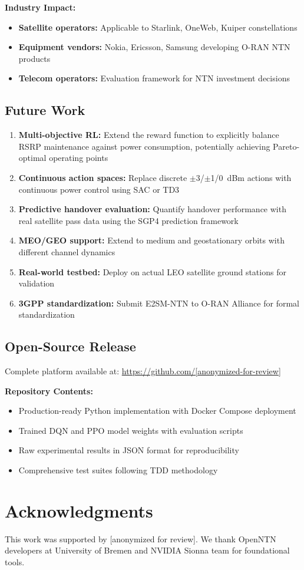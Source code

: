 \documentclass[conference]{IEEEtran}
\begin{document}
\textbf{Industry Impact:}
\begin{itemize}
    \item \textbf{Satellite operators:} Applicable to Starlink, OneWeb, Kuiper constellations
    \item \textbf{Equipment vendors:} Nokia, Ericsson, Samsung developing O-RAN NTN products
    \item \textbf{Telecom operators:} Evaluation framework for NTN investment decisions
\end{itemize}

\subsection{Future Work}

\begin{enumerate}
    \item \textbf{Multi-objective RL:} Extend the reward function to explicitly balance RSRP maintenance against power consumption, potentially achieving Pareto-optimal operating points
    \item \textbf{Continuous action spaces:} Replace discrete $\pm$3/$\pm$1/0~dBm actions with continuous power control using SAC or TD3
    \item \textbf{Predictive handover evaluation:} Quantify handover performance with real satellite pass data using the SGP4 prediction framework
    \item \textbf{MEO/GEO support:} Extend to medium and geostationary orbits with different channel dynamics
    \item \textbf{Real-world testbed:} Deploy on actual LEO satellite ground stations for validation
    \item \textbf{3GPP standardization:} Submit E2SM-NTN to O-RAN Alliance for formal standardization
\end{enumerate}

\subsection{Open-Source Release}

Complete platform available at: \url{https://github.com/[anonymized-for-review]}

\textbf{Repository Contents:}
\begin{itemize}
    \item Production-ready Python implementation with Docker Compose deployment
    \item Trained DQN and PPO model weights with evaluation scripts
    \item Raw experimental results in JSON format for reproducibility
    \item Comprehensive test suites following TDD methodology
\end{itemize}

\section*{Acknowledgments}

This work was supported by [anonymized for review]. We thank OpenNTN developers at University of Bremen and NVIDIA Sionna team for foundational tools.



\end{document}
